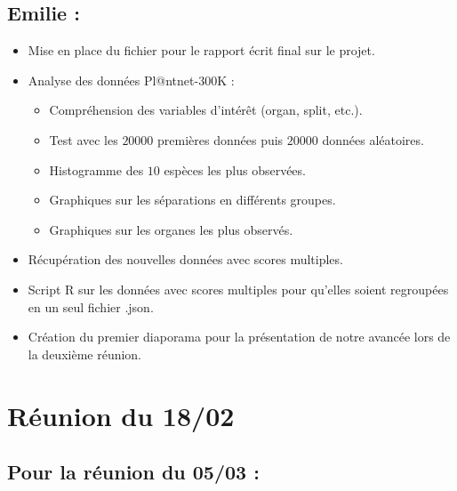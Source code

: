 \documentclass[french]{article}
\begin{document}
\subsection{Emilie :}

\begin{itemize}
    \item Mise en place du fichier pour le rapport écrit final sur le projet.
    \item Analyse des données Pl@ntnet-300K : 
    \begin{itemize}
        \item Compréhension des variables d'intérêt (organ, split, etc.).
        \item Test avec les $20000$ premières données puis $20000$ données aléatoires.
        \item Histogramme des $10$ espèces les plus observées.
        \item Graphiques sur les séparations en différents groupes.
        \item Graphiques sur les organes les plus observés.
    \end{itemize}
    \item Récupération des nouvelles données avec scores multiples.
    \item Script R sur les données avec scores multiples pour qu'elles soient regroupées en un seul fichier .json.
    \item Création du premier diaporama pour la présentation de notre avancée lors de la deuxième réunion.
\end{itemize}


\section{Réunion du 18/02}

\subsection{Pour la réunion du 05/03 :}
\end{document}
